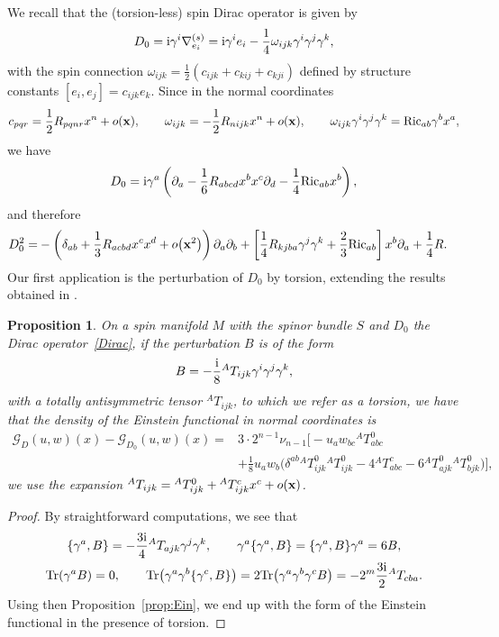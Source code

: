 \documentclass[10pt,a4paper]{amsart}
\numberwithin{equation}{section}
\newtheorem{Proposition}[Theorem]{Proposition}
\theoremstyle{definition}
\def\Tr{\mathrm{Tr}}
\begin{document}
We recall that the (torsion-less) spin Dirac operator is given by
\[
D_0={\rm i} \gamma^i\nabla_{e_i}^{(s)}={\rm i}\gamma^i e_i -\frac{1}{4}\omega_{ijk}\gamma^i\gamma^j\gamma^k,
\]
with the spin connection $\omega_{ijk}=\frac{1}{2}(c_{ijk}+c_{kij}+c_{kji})$ defined by structure constants $[e_i,e_j]=c_{ijk}e_k$. Since in the normal coordinates
\[
c_{pqr}=\frac{1}{2}R_{pqnr}x^n +o({\bf x}), \qquad
\omega_{ijk}=-\frac{1}{2}R_{nijk}x^n +o({\bf x}), \qquad
\omega_{ijk}\gamma^i\gamma^j\gamma^k
=\mathrm{Ric}_{ab}\gamma^b x^a,
\]
we have
\begin{equation}
	D_0={\rm i}\gamma^a\left(\partial_a - \frac{1}{6}R_{abcd}x^b x^c \partial_d-\frac{1}{4}\mathrm{Ric}_{ab} x^b\right),
	\label{Dirac}
\end{equation}
and therefore
\begin{align*}
D_0^2
=&-\left(\delta_{ab}+\frac{1}{3}R_{acbd}x^c x^d +o\bigl({\bf x}^2\bigr)\right)\partial_a\partial_b+\left[\frac{1}{4}R_{kjba}\gamma^j\gamma^k +\frac{2}{3}\mathrm{Ric}_{ab}\right]x^b \partial_a + \frac{1}{4}R.
\end{align*}
Our first application is the perturbation of $D_0$ by torsion, extending the results obtained in \cite{dabrowski2024}.
\begin{Proposition}
\label{example:t}
On a spin manifold $M$ with the spinor bundle $S$ and $D_0$ the Dirac operator~{\rm\eqref{Dirac}}, if the perturbation
$B$ is of the form
\begin{equation}
\label{eq:B}
B=-\frac{\rm i}{8}{}^AT_{ijk}\gamma^i\gamma^j\gamma^k,
\end{equation}
with a totally antisymmetric tensor ${}^AT_{ijk}$, to which we refer as a torsion, we have that the density of the Einstein functional in normal coordinates is
\begin{align*}%
\mathscr{G}_D(u,w)(x)-\mathscr{G}_{D_0}(u,w)(x)
		={} &3 \cdot 2^{n-1} \nu_{n-1}\biggl[-u_aw_{bc}{}^AT^{0}_{abc} \\
			& +\frac{1}{8}u_aw_b\bigl(\delta^{ab}{}^AT^{0}_{ijk}{}^AT^{0}_{ijk}-4{}^AT^{c}_{abc}-6 {}^AT^{0}_{ajk}{}^AT^{0}_{bjk}\bigr)\biggr],
		\end{align*}
 we use the expansion ${}^AT_{ijk}={}^AT^{0}_{ijk}+{}^AT^{c}_{ijk}x^c +o({\bf x})$.
\end{Proposition}
\begin{proof}
By straightforward computations, we see that
	\begin{gather}
			\{\gamma^a, B\}=-\frac{3{\rm i}}{4}{}^AT_{ajk}\gamma^j\gamma^k, \qquad \gamma^a\{\gamma^a,B\}=\{\gamma^a, B\}\gamma^a=6B,\nonumber\\
			\Tr(\gamma^a B)=0, \qquad \Tr\bigl(\gamma^a\gamma^b\{\gamma^c, B\}\bigr)=2 \Tr\bigl(\gamma^a \gamma^b\gamma^c B\bigr)=-2^{m} \frac{3{\rm i}}{2}{}^AT_{cba}.\label{eq:slady_B_spinowe}
	\end{gather}
Using then Proposition~\ref{prop:Ein}, we end up with the form of the Einstein functional in the presence of torsion.
\end{proof}
\end{document}

